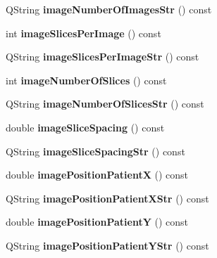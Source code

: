 \begin{DoxyCompactItemize}
\item 
\mbox{\label{class_series_info_a2f21da996a318aec02438d5f7d7dd350}} 
Q\+String {\bfseries image\+Number\+Of\+Images\+Str} () const
\item 
\mbox{\label{class_series_info_a595cb840a0fe00e330d58bee0161ba62}} 
int {\bfseries image\+Slices\+Per\+Image} () const
\item 
\mbox{\label{class_series_info_a67207f1efd50367b46d946129fb6dfe1}} 
Q\+String {\bfseries image\+Slices\+Per\+Image\+Str} () const
\item 
\mbox{\label{class_series_info_ae7a7057c7d20f59650077dfa52dec97d}} 
int {\bfseries image\+Number\+Of\+Slices} () const
\item 
\mbox{\label{class_series_info_ac8697c73a137e9047033e33b6352568b}} 
Q\+String {\bfseries image\+Number\+Of\+Slices\+Str} () const
\item 
\mbox{\label{class_series_info_a7ac539de8bcb047280dd0ae04c1ff876}} 
double {\bfseries image\+Slice\+Spacing} () const
\item 
\mbox{\label{class_series_info_adc5abb8c7656afc0ecf15eb4436ae712}} 
Q\+String {\bfseries image\+Slice\+Spacing\+Str} () const
\item 
\mbox{\label{class_series_info_a91685a94ead368bbb9b1cd697d0e5c59}} 
double {\bfseries image\+Position\+PatientX} () const
\item 
\mbox{\label{class_series_info_a3d273fccf13a4a3c84ba53bc545f4641}} 
Q\+String {\bfseries image\+Position\+Patient\+X\+Str} () const
\item 
\mbox{\label{class_series_info_a63f3d9368ab755c8a7f6d7e54d03c09d}} 
double {\bfseries image\+Position\+PatientY} () const
\item 
\mbox{\label{class_series_info_ae7e8c788abaf34369ce8cd360653a2f5}} 
Q\+String {\bfseries image\+Position\+Patient\+Y\+Str} () const

\end{DoxyCompactItemize}
